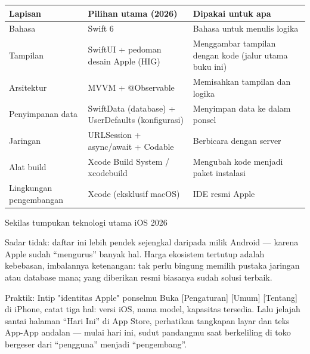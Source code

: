 
\begin{center}
\begin{tabularx}{\linewidth}{|X|X|X|}
\hline
\textbf{Lapisan} & \textbf{Pilihan utama (2026)} & \textbf{Dipakai untuk apa} \tabularnewline
\hline
Bahasa & Swift 6 & Bahasa untuk menulis logika \tabularnewline
Tampilan & SwiftUI + pedoman desain Apple (HIG) & Menggambar tampilan dengan kode (jalur utama buku ini) \tabularnewline
Arsitektur & MVVM + @Observable & Memisahkan tampilan dan logika \tabularnewline
Penyimpanan data & SwiftData (database) + UserDefaults (konfigurasi) & Menyimpan data ke dalam ponsel \tabularnewline
Jaringan & URLSession + async/await + Codable & Berbicara dengan server \tabularnewline
Alat build & Xcode Build System / xcodebuild & Mengubah kode menjadi paket instalasi \tabularnewline
Lingkungan pengembangan & Xcode (eksklusif macOS) & IDE resmi Apple \tabularnewline
\hline
\end{tabularx}
\end{center}

\begin{center}\small\color{gray}Sekilas tumpukan teknologi utama iOS 2026\end{center}

Sadar tidak: daftar ini lebih pendek sejengkal daripada milik Android — karena Apple sudah “mengurus” banyak hal. Harga ekosistem tertutup adalah kebebasan, imbalannya ketenangan: tak perlu bingung memilih pustaka jaringan atau database mana; yang diberikan resmi biasanya sudah solusi terbaik.

\begin{tcbpractice}{Praktik: Intip "identitas Apple" ponselmu}
Buka [Pengaturan] [Umum] [Tentang] di iPhone, catat tiga hal: versi iOS, nama model, kapasitas tersedia. Lalu jelajah santai halaman “Hari Ini” di App Store, perhatikan tangkapan layar dan teks App-App andalan — mulai hari ini, sudut pandangmu saat berkeliling di toko bergeser dari “pengguna” menjadi “pengembang”.

\end{tcbpractice}

